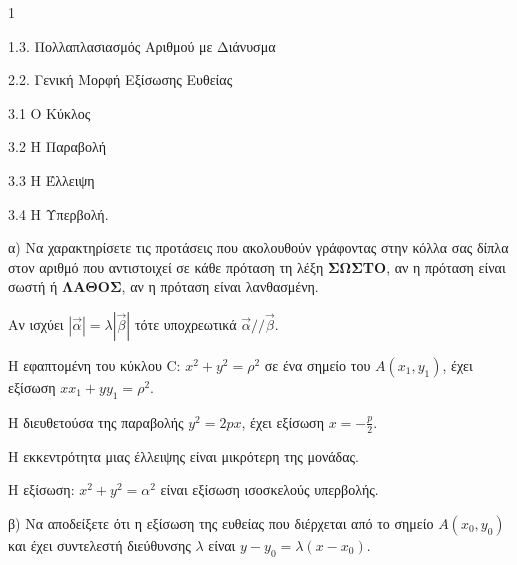 \begin{ylh}{1}
    \item 1.3. Πολλαπλασιασμός Αριθμού με Διάνυσμα
    \item 2.2. Γενική Μορφή Εξίσωσης Ευθείας
    \item 3.1 Ο Κύκλος
    \item 3.2 Η Παραβολή
    \item 3.3 Η Έλλειψη
    \item 3.4 Η Υπερβολή.
\end{ylh}
α) Να χαρακτηρίσετε τις προτάσεις που ακολουθούν γράφοντας στην κόλλα σας δίπλα στον αριθμό που αντιστοιχεί σε κάθε πρόταση τη λέξη \textbf{ΣΩΣΤΟ}, αν η πρόταση είναι σωστή ή \textbf{ΛΑΘΟΣ}, αν η πρόταση είναι λανθασμένη.
\begin{rlist}
\item Αν ισχύει $|\vec{\alpha}| = \lambda |\vec{\beta}|$ τότε υποχρεωτικά $\vec{\alpha} // \vec{\beta}$.
\item Η εφαπτομένη του κύκλου C: $x^2 + y^2 = \rho^2$ σε ένα σημείο του $A(x_1, y_1)$, έχει εξίσωση $xx_1 + yy_1 = \rho^2$.
\item Η διευθετούσα της παραβολής $y^2 = 2px$, έχει εξίσωση $x = -\frac{p}{2}$.
\item Η εκκεντρότητα μιας έλλειψης είναι μικρότερη της μονάδας.
\item Η εξίσωση: $x^2 + y^2 = \alpha^2$ είναι εξίσωση ισοσκελούς υπερβολής.
\end{rlist}
β) Να αποδείξετε ότι η εξίσωση της ευθείας που διέρχεται από το σημείο $A(x_0, y_0)$ και έχει συντελεστή διεύθυνσης $\lambda$ είναι $y - y_0 = \lambda(x - x_0)$.
